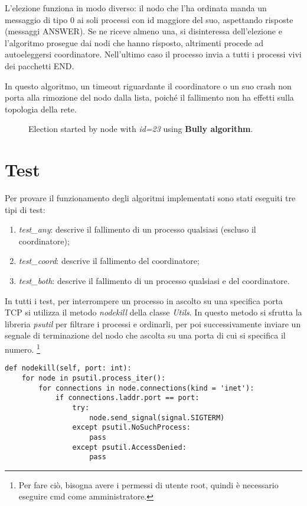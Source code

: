 \documentclass[conference]{IEEEtran}
\begin{document}
L'elezione funziona in modo diverso: il nodo che l'ha ordinata manda un messaggio di tipo 0 ai soli processi con id maggiore del suo, aspettando risposte (messaggi ANSWER).
Se ne riceve almeno una, si disinteressa dell'elezione e l'algoritmo prosegue dai nodi che hanno risposto, altrimenti procede ad autoeleggersi coordinatore.
Nell'ultimo caso il processo invia a tutti i processi vivi dei pacchetti END.

In questo algoritmo, un timeout riguardante il coordinatore o un suo crash non porta alla rimozione del nodo dalla lista, poiché il fallimento non ha effetti sulla topologia della rete.

\begin{figure}[htbp]
  \centering
  
  \caption{Election started by node with \textit{id=23} using \textbf{Bully algorithm}.}
\end{figure}


\section{Test}\label{sec:tests}

Per provare il funzionamento degli algoritmi implementati sono stati eseguiti tre tipi di test:

\begin{enumerate}
    \item \textit{test\_any}: descrive il fallimento di un processo qualsiasi (escluso il coordinatore);
    \item \textit{test\_coord}: descrive il fallimento del coordinatore;
    \item \textit{test\_both}: descrive il fallimento di un processo qualsiasi e del coordinatore.
\end{enumerate}

In tutti i test, per interrompere un processo in ascolto su una specifica porta TCP si utilizza il metodo \textit{nodekill} della classe \textit{Utils}.
In questo metodo si sfrutta la libreria \textit{psutil} per filtrare i processi e ordinarli, per poi successivamente inviare un segnale di terminazione del nodo che ascolta su una porta di cui si specifica il numero. \footnote{Per fare ciò, bisogna avere i permessi di utente root, quindi è necessario eseguire cmd come amministratore.}

\begin{lstlisting}
def nodekill(self, port: int):
    for node in psutil.process_iter():
        for connections in node.connections(kind = 'inet'):
            if connections.laddr.port == port:
                try:
                    node.send_signal(signal.SIGTERM)
                except psutil.NoSuchProcess:
                    pass
                except psutil.AccessDenied:
                    pass
\end{lstlisting}
\end{document}

